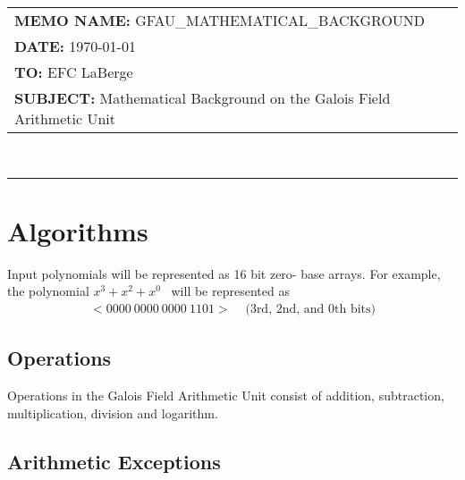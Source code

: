 \documentclass[11pt]{extarticle}
\newcommand{\examplepoly}{$x^{3}+x^{2}+x^{0}$}
\newcommand{\documentinfo}[4]{
    \begin{centering}
        \parbox{2in}{
        \begin{spacing}{1}
            \begin{flushleft}
                \begin{tabular}{l l} #1 \\ #2 \\ #3 \\ #4 \\
                \end{tabular} \\
                \rule{\textwidth}{1pt}
            \end{flushleft}
        \end{spacing} }
    \end{centering} }
\begin{document}
    \documentinfo
    {\textbf{MEMO NAME:} GFAU\_MATHEMATICAL\_BACKGROUND}
    {\textbf{DATE:} \today}
    {\textbf{TO:} EFC LaBerge}
    {\textbf{SUBJECT: } Mathematical Background on the Galois Field Arithmetic
    Unit}
    \vspace{-0.1in}

    

    \section{Algorithms} Input polynomials will be represented as 16 bit zero-
    base arrays. For example, the polynomial \examplepoly~ will be represented
    as
        \begin{equation*}
            \begin{split}
                <0000 \ 0000 \ 0000 \ 1101> & \text{  (3rd, 2nd, and 0th bits)}
            \end{split}
        \end{equation*}

        

        
        \subsection{Operations} Operations in the Galois Field Arithmetic Unit
        consist of addition, subtraction, multiplication, division and
        logarithm.

        
        
        
        

        \subsection{Arithmetic Exceptions}

        
        

        
        
\end{document}

